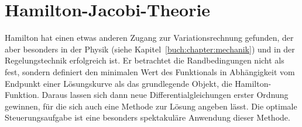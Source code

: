 %
%
%
\chapter{Hamilton-Jacobi-Theorie
\label{buch:chapter:hamiltonjacobi}}
Hamilton hat einen etwas anderen Zugang zur Variationsrechnung
gefunden, der aber besonders in der Physik (siehe
Kapitel~\ref{buch:chapter:mechanik}) und in der Regelungstechnik
erfolgreich ist.
Er betrachtet die Randbedingungen nicht als fest, sondern definiert
den minimalen Wert des Funktionals in Abhängigkeit vom Endpunkt einer
Lösungskurve als das grundlegende Objekt, die Hamilton-Funktion.
Daraus lassen sich dann neue Differentialgleichungen erster Ordnung
gewinnen, für die sich auch eine Methode zur Lösung angeben lässt.
Die optimale Steuerungsaufgabe ist eine besonders spektakuläre 
Anwendung dieser Methode.






